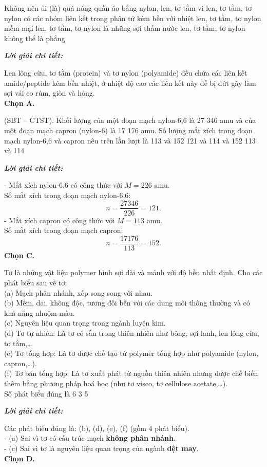 \documentclass[11pt,a4paper]{article}
\def\loigiai#1{
\par\begingroup\color{blue!80!black}\small
\noindent\textbf{\textit{Lời giải chi tiết:}}\par
#1\par\endgroup}
\begin{document}
\begin{ex}
Không nên ủi (là) quá nóng quần áo bằng nylon, len, tơ tằm vì
\choice
{\True len, tơ tằm, tơ nylon có các nhóm liên kết trong phân tử kém bền với nhiệt}
{len, tơ tằm, tơ nylon mềm mại}
{len, tơ tằm, tơ nylon là những sợi thấm nước}
{len, tơ tằm, tơ nylon không thể là phẳng}
\loigiai{
Len lông cừu, tơ tằm (protein) và tơ nylon (polyamide) đều chứa các liên kết amide/peptide \ce{-CO-NH-} kém bền nhiệt, ở nhiệt độ cao các liên kết này dễ bị đứt gãy làm sợi vải co rúm, giòn và hỏng.\\
\textbf{Chọn A.}}
\end{ex}

\begin{ex}
(SBT -- CTST). Khối lượng của một đoạn mạch nylon-6,6 là 27 346 amu và của một đoạn mạch capron (nylon-6) là 17 176 amu. Số lượng mắt xích trong đoạn mạch nylon-6,6 và capron nêu trên lần lượt là
\choice
{113 và 152}
{121 và 114}
{ và 152}
{113 và 114}
\loigiai{
- Mắt xích nylon-6,6 có công thức \ce{[-NH-(CH2)6-NH-CO-(CH2)4-CO-]} với $M = 226\text{ amu}$.\\
Số mắt xích trong đoạn mạch nylon-6,6:
$$n = \frac{27346}{226} = 121.$$
- Mắt xích capron có công thức \ce{[-NH-(CH2)5-CO-]} với $M = 113\text{ amu}$.\\
Số mắt xích trong đoạn mạch capron:
$$n = \frac{17176}{113} = 152.$$
\textbf{Chọn C.}}
\end{ex}

\begin{ex}
Tơ là những vật liệu polymer hình sợi dài và mảnh với độ bền nhất định. Cho các phát biểu sau về tơ:\\
(a) Mạch phân nhánh, xếp song song với nhau.\\
(b) Mềm, dai, không độc, tương đối bền với các dung môi thông thường và có khả năng nhuộm màu.\\
(c) Nguyên liệu quan trọng trong ngành luyện kim.\\
(d) Tơ tự nhiên: Là tơ có sẵn trong thiên nhiên như bông, sợi lanh, len lông cừu, tơ tằm,\dots\\
(e) Tơ tổng hợp: Là tơ được chế tạo từ polymer tổng hợp như polyamide (nylon, capron,\dots).\\
(f) Tơ bán tổng hợp: Là tơ xuất phát từ nguồn thiên nhiên nhưng được chế biến thêm bằng phương pháp hoá học (như tơ visco, tơ cellulose acetate,\dots).\\
Số phát biểu đúng là
\choice
{6}
{3}
{5}
{}
\loigiai{
Các phát biểu đúng là: (b), (d), (e), (f) (gồm 4 phát biểu).\\
- (a) Sai vì tơ có cấu trúc mạch \textbf{không phân nhánh}.\\
- (c) Sai vì tơ là nguyên liệu quan trọng của ngành \textbf{dệt may}.\\
\textbf{Chọn D.}}
\end{ex}
\end{document}
